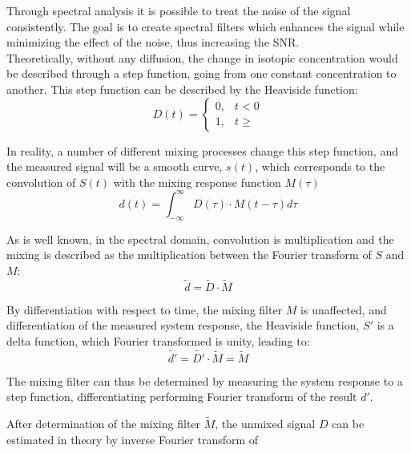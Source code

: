 \documentclass[../../CompleteThesis2/Complete_2ndDraft]{subfiles}
\begin{document}
%

Through spectral analysis it is possible to treat the noise of the signal consistently. The goal is to create spectral filters which enhances the signal while minimizing the effect of the noise, thus increasing the SNR.\\
Theoretically, without any diffusion, the change in isotopic concentration would be described through a step function, going from one constant concentration to another. This step function can be described by the Heaviside function:
\begin{equation}
	D(t) = \begin{cases}
		0, & t < 0 \\
		1, & t \geq
	\end{cases}
\end{equation}

In reality, a number of different mixing processes change this step function, and the measured signal will be a smooth curve, $s(t)$, which corresponds to the convolution of $S(t)$ with the mixing response function $M(\tau)$
\begin{equation}
	d(t) = \int_{- \infty}^{\infty} D(\tau) \cdot M(t - \tau)d\tau
\end{equation}

As is well known, in the spectral domain, convolution is multiplication and the mixing is described as the multiplication between the Fourier transform of $S$ and $M$:
\begin{equation}
	\tilde{d} = \tilde{D} \cdot \tilde{M}
\end{equation}


By differentiation with respect to time, the mixing filter $M$ is unaffected, and differentiation of the measured system response, the Heaviside function, $S'$ is a delta function, which Fourier transformed is unity, leading to:
\begin{equation}
	\tilde{d'} = \tilde{D'} \cdot \tilde{M} = \tilde{M}
\end{equation}

The mixing filter can thus be determined by measuring the system response to a step function, differentiating performing Fourier transform of the result $d'$.

After determination of the mixing filter $\tilde{M}$, the unmixed signal $D$ can be estimated in theory by inverse Fourier transform of
\end{document}
